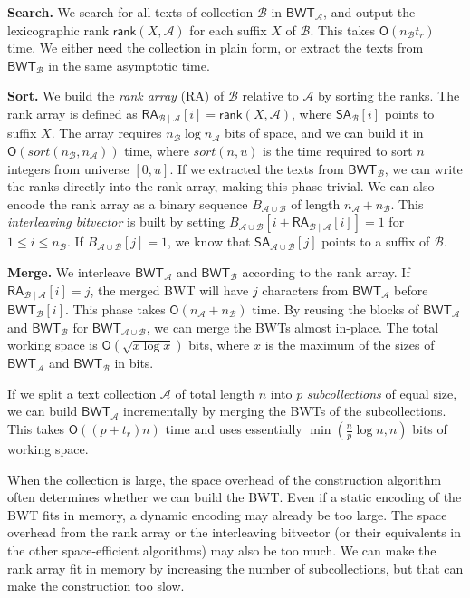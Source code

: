 \documentclass[smallabstract,smallcaptions]{dccpaper}
\newcommand{\Oh}{\ensuremath{\mathsf{O}}}
\newcommand{\BWT}{\textsf{BWT}}
\newcommand{\RA}{\textsf{RA}}
\newcommand{\mSA}{\ensuremath{\mathsf{SA}}}
\newcommand{\mBWT}{\ensuremath{\mathsf{BWT}}}
\newcommand{\mRA}{\ensuremath{\mathsf{RA}}}
\newcommand{\mrank}{\ensuremath{\mathsf{rank}}}
\newcommand{\Acoll}{\ensuremath{\mathcal{A}}}
\newcommand{\Bcoll}{\ensuremath{\mathcal{B}}}
\begin{document}
\smallbreak\noindent\textbf{Search.} We search for all texts of collection $\Bcoll$ in $\mBWT_{\Acoll}$, and output the lexicographic rank $\mrank(X, \Acoll)$ for each suffix $X$ of $\Bcoll$. This takes $\Oh(n_{\Bcoll} t_{r})$ time. We either need the collection in plain form, or extract the texts from $\mBWT_{\Bcoll}$ in the same asymptotic time.

\smallbreak\noindent\textbf{Sort.} We build the \emph{rank array} (\RA) of $\Bcoll$ relative to $\Acoll$ by sorting the ranks. The rank array is defined as $\mRA_{\Bcoll \mid \Acoll}[i] = \mrank(X, \Acoll)$, where $\mSA_{\Bcoll}[i]$ points to suffix $X$. The array requires $n_{\Bcoll} \log n_{\Acoll}$ bits of space, and we can build it in $\Oh(sort(n_{\Bcoll}, n_{\Acoll}))$ time, where $sort(n, u)$ is the time required to sort $n$ integers from universe $[0,u]$. If we extracted the texts from $\mBWT_{\Bcoll}$, we can write the ranks directly into the rank array, making this phase trivial. We can also encode the rank array as a binary sequence $B_{\Acoll \cup \Bcoll}$ of length $n_{\Acoll} + n_{\Bcoll}$. This \emph{interleaving bitvector} is built by setting $B_{\Acoll \cup \Bcoll}[i + \mRA_{\Bcoll \mid \Acoll}[i]] = 1$ for $1 \le i \le n_{\Bcoll}$. If $B_{\Acoll \cup \Bcoll}[j] = 1$, we know that $\mSA_{\Acoll \cup \Bcoll}[j]$ points to a suffix of $\Bcoll$.

\smallbreak\noindent\textbf{Merge.} We interleave $\mBWT_{\Acoll}$ and $\mBWT_{\Bcoll}$ according to the rank array. If $\mRA_{\Bcoll \mid \Acoll}[i] = j$, the merged \BWT{} will have $j$ characters from $\mBWT_{\Acoll}$ before $\mBWT_{\Bcoll}[i]$. This phase takes $\Oh(n_{\Acoll} + n_{\Bcoll})$ time. By reusing the blocks of $\mBWT_{\Acoll}$ and $\mBWT_{\Bcoll}$ for $\mBWT_{\Acoll \cup \Bcoll}$, we can merge the \BWT{}s almost in-place. The total working space is $\Oh(\sqrt{x \log x})$ bits, where $x$ is the maximum of the sizes of $\mBWT_{\Acoll}$ and $\mBWT_{\Bcoll}$ in bits.


\Section{Large-scale \BWT{} merging}

If we split a text collection $\Acoll$ of total length $n$ into $p$ \emph{subcollections} of equal size, we can build $\mBWT_{\Acoll}$ incrementally by merging the \BWT{}s of the subcollections. This takes $\Oh((p+t_{r})n)$ time and uses essentially $\min(\frac{n}{p} \log n, n)$ bits of working space.

When the collection is large, the space overhead of the construction algorithm often determines whether we can build the \BWT{}.
Even if a static encoding of the \BWT{} fits in memory, a dynamic encoding may already be too large. The space overhead from the rank array or the interleaving bitvector (or their equivalents in the other space-efficient algorithms) may also be too much. We can make the rank array fit in memory by increasing the number of subcollections, but that can make the construction too slow.
\end{document}
